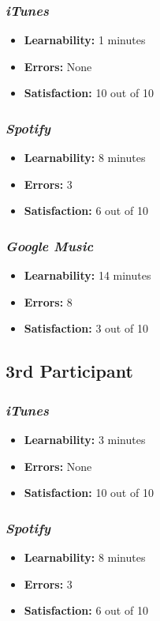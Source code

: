 \documentclass{article}
\begin{document}
\begin{multicols}{2}
\subsubsection{\it iTunes}
\begin{itemize}
	\item {\bf Learnability:} 1 minutes
	\item {\bf Errors:}  None
	\item {\bf Satisfaction:} 10 out of 10 
\end{itemize}

\subsubsection{\it Spotify}
\begin{itemize}
	\item {\bf Learnability:} 8 minutes
	\item {\bf Errors:} 3
	\item {\bf Satisfaction:} 6 out of 10 
\end{itemize}

\subsubsection{\it Google Music}
\begin{itemize}
\item {\bf Learnability:} 14 minutes
	\item {\bf Errors:} 8
	\item {\bf Satisfaction:} 3 out of 10 
\end{itemize}

\subsection{3rd Participant}

\subsubsection{\it iTunes}
\begin{itemize}
	\item {\bf Learnability:} 3 minutes
	\item {\bf Errors:}  None
	\item {\bf Satisfaction:} 10 out of 10 
\end{itemize}

\subsubsection{\it Spotify}
\begin{itemize}
	\item {\bf Learnability:} 8 minutes
	\item {\bf Errors:} 3
	\item {\bf Satisfaction:} 6 out of 10 
\end{itemize}


\end{multicols}
\end{document}
